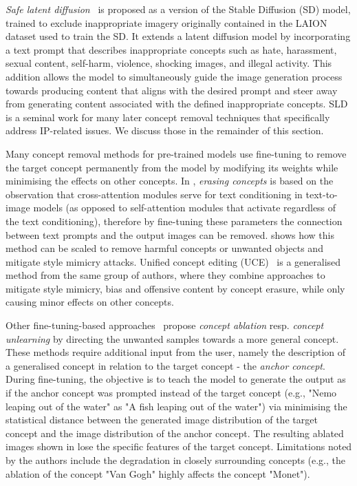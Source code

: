 \documentclass[conference,table]{IEEEtran}
\begin{document}
\textit{Safe latent diffusion}~\cite{schramowski_safe_2023} is proposed as a version of the Stable Diffusion (SD) model, trained to exclude inappropriate imagery originally contained in the LAION dataset used to train the SD. 
It extends a latent diffusion model by incorporating a text prompt that describes inappropriate concepts such as hate, harassment, sexual content, self-harm, violence, shocking images, and illegal activity.
This addition allows the model to simultaneously guide the image generation process towards producing content that aligns with the desired prompt and steer away from generating content associated with the defined inappropriate concepts.
SLD is a seminal work for many later concept removal techniques that specifically address IP-related issues. We discuss those in the remainder of this section.

Many concept removal methods for pre-trained models use fine-tuning to remove the target concept permanently from the model by modifying its weights while minimising the effects on other concepts.
In \cite{gandikota_erasing_2023}, \textit{erasing concepts} is based on the observation that cross-attention modules serve for text conditioning in text-to-image models (as opposed to self-attention modules that activate regardless of the text conditioning), therefore by fine-tuning these parameters the connection between text prompts and the output images can be removed. 
 shows how this method can be scaled to remove harmful concepts or unwanted objects and mitigate style mimicry attacks.
Unified concept editing (UCE)~\cite{gandikota_unified_2024} is a generalised method from the same group of authors, where they combine approaches to mitigate style mimicry, bias and offensive content by concept erasure, while only causing minor effects on other concepts.   

Other fine-tuning-based approaches~\cite{kumari_ablating_2023,zhang_forget-me-not_2023} propose \textit{concept ablation} resp. \textit{concept unlearning} by directing the unwanted samples towards a more general concept.
These methods require additional input from the user, namely the description of a generalised concept in relation to the target concept - the \textit{anchor concept}. 
During fine-tuning, the objective is to teach the model to generate the output as if the anchor concept was prompted instead of the target concept (e.g., "Nemo leaping out of the water" as "A fish leaping out of the water") via minimising the statistical distance between the generated image distribution of the target concept and the image distribution of the anchor concept.
The resulting ablated images shown in  lose the specific features of the target concept. 
Limitations noted by the authors include the degradation in closely surrounding concepts (e.g., the ablation of the concept "Van Gogh" highly affects the concept "Monet").
\end{document}
